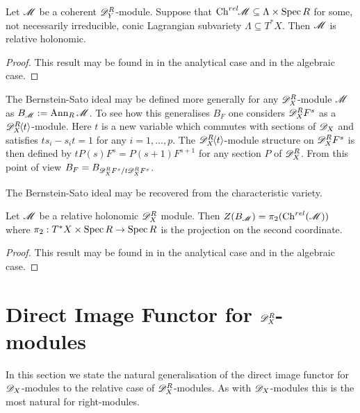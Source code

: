 \begin{lemma}\label{lem: InclusionCharVar}
  Let $\mathscr{M}$ be a coherent $\mathscr{D}_Y^R$-module. Suppose that $\operatorname{Ch}^{rel}\mkern-5mu \mathscr{M} \subseteq \Lambda \times \operatorname{Spec} R$ for some, not necessarily irreducible, conic Lagrangian subvariety $\Lambda\subseteq T^*X$. Then $\mathscr{M}$ is relative holonomic.
\end{lemma}
\begin{proof}
  This result may be found in \cite{maisonobe2016filtration} in the analytical case and \cite{budur2019zero} in the algebraic case.
\end{proof}
The Bernstein-Sato ideal may be defined more generally for any $\mathscr{D}_X^R$-module $\mathscr{M}$ as $B_{\mathscr{M}} := \operatorname{Ann}_{R}\mathscr{M}$. To see how this generalises $B_F$ one considers $\mathscr{D}_X^R F^s$ as a $\mathscr{D}_X^R\mkern-5mu\left\langle t \right\rangle$-module.
Here $t$ is a new variable which commutes with sections of $\mathscr{D}_X$ and satisfies $ts_i - s_it = 1$ for any $i=1,\ldots,
p$.  The $\mathscr{D}_X^R\mkern-5mu\left\langle t \right\rangle$-module structure on $\mathscr{D}_X^R F^s$ is then defined by $tP(s)F^s = P(s+1)F^{s + 1}$ for any section $P$ of $\mathscr{D}_X^R$. From this point of view $B_F = B_{\mathscr{D}_X^R F^s / t\mathscr{D}_X^R F^s}$.

The Bernstein-Sato ideal may be recovered from the characteristic variety.
\begin{proposition}\label{prop: ProjectionBernsteinSatoRelativeChar}
  Let $\mathscr{M}$ be a relative holonomic $\mathscr{D}_X^R$ module. Then  $Z(B_{\mathscr{M}}) = \pi_2(\operatorname{Ch}^{rel}(\mathscr{M}))$ where $\pi_2:T^*X\times \operatorname{Spec} R \to \operatorname{Spec} R$ is the projection on the second coordinate.
\end{proposition}
\begin{proof}
  This result may be found in \cite{maisonobe2016filtration} in the analytical case and \cite{budur2019zero} in the algebraic case.
\end{proof}
\section{Direct Image Functor for $\mathscr{D}_X^R$-modules}
    In this section we state the natural generalisation of the direct image functor for $\mathscr{D}_X$-modules to the relative case of $\mathscr{D}_X^R$-modules. As with $\mathscr{D}_X$-modules this is the most natural for right-modules.

